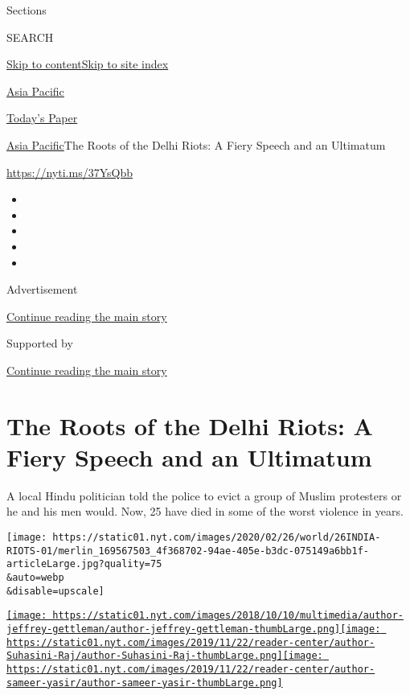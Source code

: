 Sections

SEARCH

\protect\hyperlink{site-content}{Skip to
content}\protect\hyperlink{site-index}{Skip to site index}

\href{https://www.nytimes.com/section/world/asia}{Asia Pacific}

\href{https://myaccount.nytimes.com/auth/login?response_type=cookie\&client_id=vi}{}

\href{https://www.nytimes.com/section/todayspaper}{Today's Paper}

\href{/section/world/asia}{Asia Pacific}\textbar{}The Roots of the Delhi
Riots: A Fiery Speech and an Ultimatum

\url{https://nyti.ms/37YsQbb}

\begin{itemize}
\item
\item
\item
\item
\item
\end{itemize}

Advertisement

\protect\hyperlink{after-top}{Continue reading the main story}

Supported by

\protect\hyperlink{after-sponsor}{Continue reading the main story}

\hypertarget{the-roots-of-the-delhi-riots-a-fiery-speech-and-an-ultimatum}{%
\section{The Roots of the Delhi Riots: A Fiery Speech and an
Ultimatum}\label{the-roots-of-the-delhi-riots-a-fiery-speech-and-an-ultimatum}}

A local Hindu politician told the police to evict a group of Muslim
protesters or he and his men would. Now, 25 have died in some of the
worst violence in years.

\texttt{[image: https://static01.nyt.com/images/2020/02/26/world/26INDIA-RIOTS-01/merlin\_169567503\_4f368702-94ae-405e-b3dc-075149a6bb1f-articleLarge.jpg?quality=75\\\&auto=webp\\\&disable=upscale]}

\href{https://www.nytimes.com/by/jeffrey-gettleman}{\texttt{[image: https://static01.nyt.com/images/2018/10/10/multimedia/author-jeffrey-gettleman/author-jeffrey-gettleman-thumbLarge.png]}}\href{https://www.nytimes.com/by/suhasini-raj}{\texttt{[image: https://static01.nyt.com/images/2019/11/22/reader-center/author-Suhasini-Raj/author-Suhasini-Raj-thumbLarge.png]}}\href{https://www.nytimes.com/by/sameer-yasir}{\texttt{[image: https://static01.nyt.com/images/2019/11/22/reader-center/author-sameer-yasir/author-sameer-yasir-thumbLarge.png]}}

